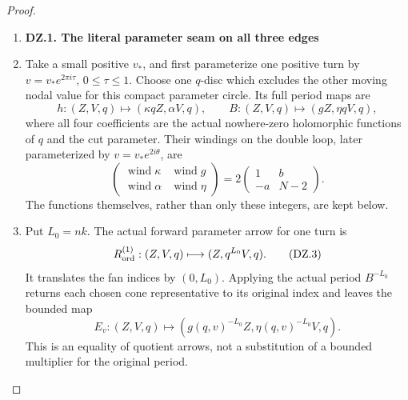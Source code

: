 \begin{proof}
\begin{enumerate}[label=\arabic*.]
\item \par

\medskip\noindent\textbf{DZ.1. The literal parameter seam on all three edges}

\par\nobreak

\item Take a small positive \(v_*\), and first parameterize one positive
turn by \(v=v_*e^{2\pi i\tau}\), \(0\leq\tau\leq1\). Choose one
\(q\)-disc which excludes the other moving nodal value for this
compact parameter circle. Its full period maps are
\[
 h:(Z,V,q)\longmapsto(\kappa qZ,\alpha V,q),\qquad
 B:(Z,V,q)\longmapsto(gZ,\eta qV,q),                 \tag{DZ.1}
\]
where all four coefficients are the actual nowhere-zero holomorphic
functions of \(q\) and the cut parameter. Their windings on the
double loop, later parameterized by \(v=v_*e^{2i\theta}\), are
\[
 \begin{pmatrix}\operatorname{wind}\kappa&
                 \operatorname{wind}g\\
                 \operatorname{wind}\alpha&
                 \operatorname{wind}\eta\end{pmatrix}
       =2\begin{pmatrix}1&b\\-a&N-2\end{pmatrix}.    \tag{DZ.2}
\]
The functions themselves, rather than only these integers, are kept
below.

\item Put \(L_0=nk\). The actual forward parameter arrow for one turn is
\[
 R_{\rm ord}^{(1)}:(Z,V,q)\longmapsto(Z,q^{L_0}V,q). \tag{DZ.3}
\]
It translates the fan indices by \((0,L_0)\). Applying the actual
period \(B^{-L_0}\) returns each chosen cone representative to its
original index and leaves the bounded map
\[
 E_v:(Z,V,q)\longmapsto(g(q,v)^{-L_0}Z,
                         \eta(q,v)^{-L_0}V,q).     \tag{DZ.4}
\]
This is an equality of quotient arrows, not a substitution of a
bounded multiplier for the original period.


\end{enumerate}
\end{proof}
